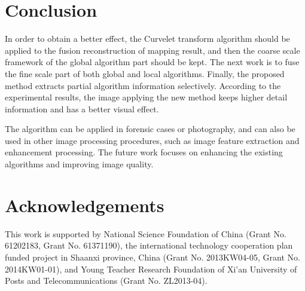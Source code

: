 \documentclass[11pt]{article}
\begin{document}
\section{Conclusion}

In order to obtain a better effect, the Curvelet transform algorithm should be applied to the fusion reconstruction of mapping result, and then the coarse scale framework of the global algorithm part should be kept. The next work is to fuse the fine scale part of both global and local algorithms. Finally, the proposed method extracts partial algorithm information selectively. According to the experimental results, the image applying the new method keeps higher detail information and has a better visual effect.

The algorithm can be applied in forensic cases or photography, and can also be used in other image processing procedures, such as image feature extraction and enhancement processing. The future work focuses on enhancing the existing algorithms and improving image quality.

\section*{Acknowledgements}

This work is supported by National Science Foundation of China (Grant No. 61202183, Grant No. 61371190), the international technology cooperation plan funded project in Shaanxi province, China (Grant No. 2013KW04-05, Grant No. 2014KW01-01), and Young Teacher Research Foundation of Xi'an University of Posts and Telecommunications (Grant No. ZL2013-04).
\end{document}
